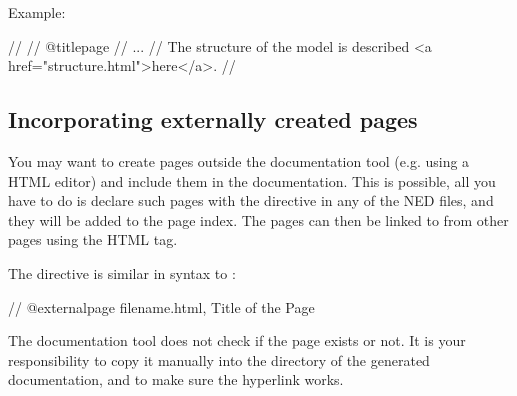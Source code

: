 Example:
\begin{ned}
//
// @titlepage
// ...
// The structure of the model is described <a href="structure.html">here</a>.
//
\end{ned}


\subsection{Incorporating externally created pages}

You may want to create pages outside the documentation tool
(e.g. using a HTML editor) and include them in the documentation.
This is possible, all you have to do is declare such pages with
the  directive in any of the NED files, and
they will be added to the page index. The pages can then be linked to
from other pages using the HTML  tag.

The  directive is similar in syntax to :

\begin{ned}
// @externalpage filename.html, Title of the Page
\end{ned}

The documentation tool does not check if the page exists
or not. It is your responsibility to copy it manually into
the directory of the generated documentation, and to make
sure the hyperlink works.


